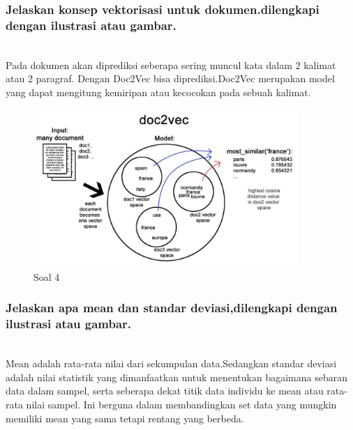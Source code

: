 	\subsubsection{Jelaskan konsep vektorisasi untuk dokumen.dilengkapi dengan ilustrasi atau gambar.}
	\hfill\\
	Pada dokumen akan diprediksi seberapa sering muncul kata dalam 2 kalimat atau 2 paragraf. Dengan Doc2Vec bisa diprediksi.Doc2Vec merupakan model yang dapat mengitung kemiripan atau kecocokan pada sebuah kalimat.
	
	\begin{figure}[H]
		\begin{center}
		 \includegraphics[width=10cm]{figures/1174076/figures5/teori4.png}
		 \caption{Soal 4}	
		\end{center}
	\end{figure}
	
	\subsubsection{Jelaskan apa mean dan standar deviasi,dilengkapi dengan ilustrasi atau gambar.} 
	\hfill\\
	Mean adalah rata-rata nilai dari sekumpulan data.Sedangkan standar deviasi adalah nilai statistik yang dimanfaatkan untuk menentukan bagaimana sebaran data dalam sampel, serta seberapa dekat titik data individu ke mean atau rata-rata nilai sampel. Ini berguna dalam membandingkan set data yang mungkin memiliki mean yang sama tetapi rentang yang berbeda.
	
